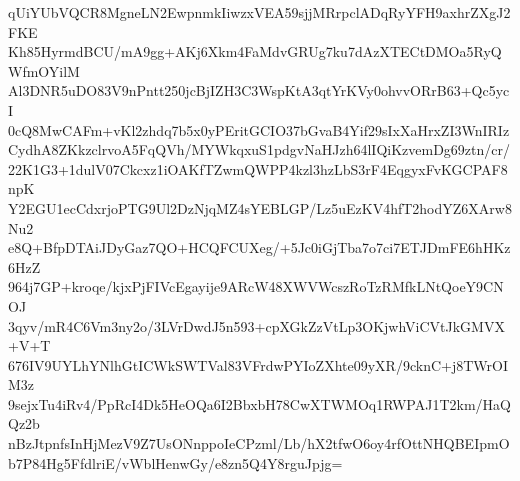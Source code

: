 qUiYUbVQCR8MgneLN2EwpnmkIiwzxVEA59sjjMRrpclADqRyYFH9axhrZXgJ2FKE
Kh85HyrmdBCU/mA9gg+AKj6Xkm4FaMdvGRUg7ku7dAzXTECtDMOa5RyQWfmOYilM
Al3DNR5uDO83V9nPntt250jcBjIZH3C3WspKtA3qtYrKVy0ohvvORrB63+Qc5ycI
0cQ8MwCAFm+vKl2zhdq7b5x0yPEritGCIO37bGvaB4Yif29sIxXaHrxZI3WnIRIz
CydhA8ZKkzclrvoA5FqQVh/MYWkqxuS1pdgvNaHJzh64lIQiKzvemDg69ztn/cr/
22K1G3+1dulV07Ckcxz1iOAKfTZwmQWPP4kzl3hzLbS3rF4EqgyxFvKGCPAF8npK
Y2EGU1ecCdxrjoPTG9Ul2DzNjqMZ4sYEBLGP/Lz5uEzKV4hfT2hodYZ6XArw8Nu2
e8Q+BfpDTAiJDyGaz7QO+HCQFCUXeg/+5Jc0iGjTba7o7ci7ETJDmFE6hHKz6HzZ
964j7GP+kroqe/kjxPjFIVcEgayije9ARcW48XWVWcszRoTzRMfkLNtQoeY9CNOJ
3qyv/mR4C6Vm3ny2o/3LVrDwdJ5n593+cpXGkZzVtLp3OKjwhViCVtJkGMVX+V+T
676IV9UYLhYNlhGtICWkSWTVal83VFrdwPYIoZXhte09yXR/9cknC+j8TWrOIM3z
9sejxTu4iRv4/PpRcI4Dk5HeOQa6I2BbxbH78CwXTWMOq1RWPAJ1T2km/HaQQz2b
nBzJtpnfsInHjMezV9Z7UsONnppoIeCPzml/Lb/hX2tfwO6oy4rfOttNHQBEIpmO
b7P84Hg5FfdlriE/vWblHenwGy/e8zn5Q4Y8rguJpjg=
